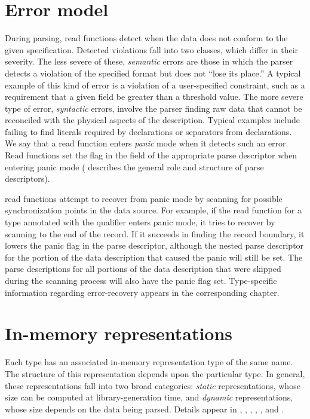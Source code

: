 \section{Error model}
\label{sec:common-error-model}
During parsing, \pads{} read functions detect when the data does not
conform to the given specification.  Detected violations fall into two
classes, which differ in their severity.  The less severe of these,
\textit{semantic} errors are those in which the parser detects a
violation of the specified format but does not ``lose its place.''  A
typical example of this kind of error is a violation of a
user-specified constraint, such as a requirement that a given field be
greater than a threshold value.  The more severe type of error,
\textit{syntactic} errors, involve the parser finding raw data that
cannot be reconciled with the physical aspects of the description.
Typical examples include failing to find literals required by
\Pstruct{} declarations or separators from \Parray{} declarations. We
say that a read function enters \textit{panic} mode when it detects
such an error. Read functions set the  flag in the
 field of the appropriate parse descriptor when entering
panic mode ( describes the general
role and structure of parse descriptors).

\pads{} read functions attempt to recover from panic mode by scanning
for possible synchronization points in the data source.
For example, if the read function for a \pads{} type  annotated with
the \Precord{} qualifier enters panic mode, it tries to
recover by scanning to the end of the record.  If it succeeds in
finding the record boundary, it lowers the panic flag in the 
parse descriptor, although the nested parse descriptor for the portion
of the data description that caused the panic will still be set.  The parse
descriptions for all portions of the data description that were
skipped during the scanning process will also have the panic flag set.
Type-specific information regarding error-recovery appears in the
corresponding chapter.



\section{In-memory representations}
\label{sec:common-rep}
Each \PADS{} type  has an associated in-memory representation
type of the same name.  The structure of this representation depends
upon the particular \PADS{} type.  
In general, these representations fall into two broad categories:
\textit{static} representations, whose size can be computed at
library-generation time, and \textit{dynamic} representations, whose size 
depends on the data being parsed. 
Details appear in 
, ,
, , 
, and .

